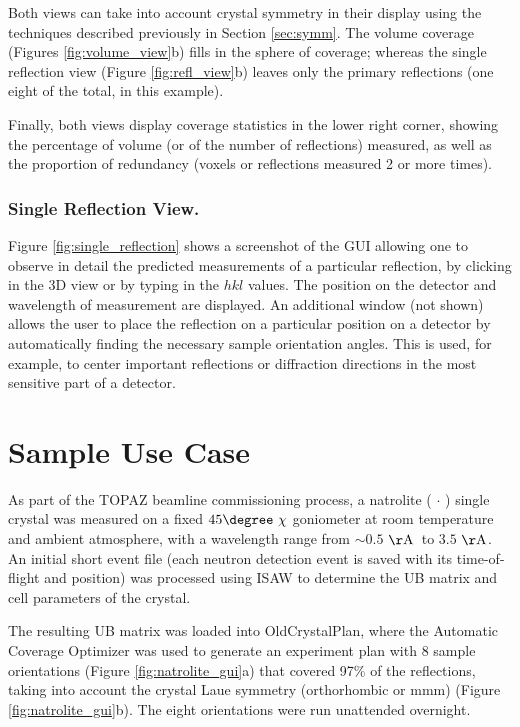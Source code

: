 \documentclass[final]{iucr}              %
\newcommand{\ang}{$\mathrm{\AA} $}
\begin{document}
Both views can take into account crystal symmetry in their display using the
techniques described previously in Section \ref{sec:symm}.
The volume coverage (Figures \ref{fig:volume_view}b) fills in the sphere of
coverage; 
whereas the single reflection view (Figure \ref{fig:refl_view}b) leaves only
the primary reflections (one eight of the total, in this example).
 
Finally, both views display coverage statistics in the lower right
corner, showing the percentage of volume (or of the number of reflections) measured,
as well as the proportion of redundancy (voxels or reflections measured 2 or more
times). 

\subsubsection{Single Reflection View.}
Figure \ref{fig:single_reflection} shows a screenshot of the GUI allowing one to
observe in detail the predicted measurements of a particular reflection, by clicking
in the 3D view or by typing in the $hkl$ values. The position on the detector
and wavelength of measurement are displayed. An additional window (not shown) allows the user to place the reflection on a particular
position on a detector by automatically finding the necessary sample orientation
angles. This is used, for example, to center important reflections or diffraction
directions in the most sensitive part of a detector.



\section{Sample Use Case}

As part of the TOPAZ beamline commissioning process, a natrolite
( $\cdot$ ) single crystal was measured on a fixed
$45\degree\ \chi$ goniometer at room temperature and ambient atmosphere, with a
wavelength range from $\sim0.5$ \ang\ to $3.5$ \ang.
An initial short event file (each neutron detection event is saved with its
time-of-flight and position) was processed using ISAW to determine the UB
matrix and cell parameters of the crystal.

The resulting UB matrix was loaded into OldCrystalPlan, where the Automatic
Coverage Optimizer was used to generate an experiment plan with 8 sample
orientations (Figure \ref{fig:natrolite_gui}a) that covered 97\% of the reflections,
taking into account the crystal Laue symmetry (orthorhombic or mmm) (Figure
\ref{fig:natrolite_gui}b). The eight orientations were run
unattended overnight.
\end{document}
